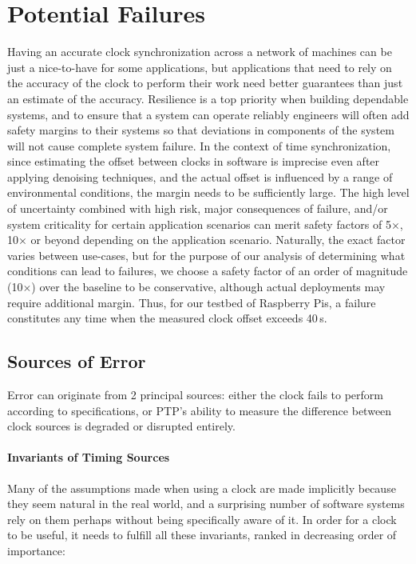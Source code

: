 \newcommand{\safetyMargin}{10$\times$}

\section{Potential Failures}

Having an accurate clock synchronization across a network of machines can be just a nice-to-have for some applications, but applications that need to rely on the accuracy of the clock to perform their work need better guarantees than just an estimate of the accuracy.
Resilience is a top priority when building dependable systems, and to ensure that a system can operate reliably engineers will often add safety margins to their systems so that deviations in components of the system will not cause complete system failure.
In the context of time synchronization, since estimating the offset between clocks in software is imprecise even after applying denoising techniques, and the actual offset is influenced by a range of environmental conditions, the margin needs to be sufficiently large.
The high level of uncertainty combined with high risk, major consequences of failure, and/or system criticality for certain application scenarios can merit safety factors of 5$\times$, 10$\times$ or beyond depending on the application scenario.
Naturally, the exact factor varies between use-cases, but for the purpose of our analysis of determining what conditions can lead to failures, we choose a safety factor of an order of magnitude (\safetyMargin) over the baseline to be conservative, although actual deployments may require additional margin.
Thus, for our testbed of Raspberry Pis, a failure constitutes any time when the measured clock offset exceeds 40\,\textmu{}s.

\subsection{Sources of Error}

Error can originate from 2 principal sources: either the clock fails to perform according to specifications, or PTP's ability to measure the difference between clock sources is degraded or disrupted entirely.

\paragraph*{Invariants of Timing Sources} Many of the assumptions made when using a clock are made implicitly because they seem natural in the real world, and a surprising number of software systems rely on them perhaps without being specifically aware of it. In order for a clock to be useful, it needs to fulfill all these invariants, ranked in decreasing order of importance:

